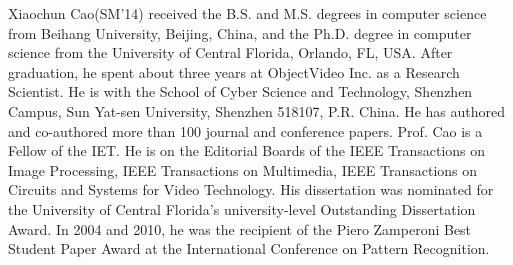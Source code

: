 \begin{IEEEbiography}
{Xiaochun Cao}(SM'14)
received the B.S. and M.S. degrees in computer science from Beihang University, Beijing, China, and the Ph.D. degree in computer science from the University of Central Florida, Orlando, FL, USA. After graduation, he spent about three years at ObjectVideo Inc. as a Research Scientist. He is with the School of Cyber Science and Technology, Shenzhen Campus, Sun Yat-sen University, Shenzhen 518107, P.R. China. He has authored and co-authored more than 100 journal and conference papers.
Prof. Cao is a Fellow of the IET. He is on the Editorial Boards of the IEEE Transactions on Image Processing, IEEE Transactions on Multimedia, IEEE Transactions on Circuits and Systems for Video Technology. His dissertation was nominated for the University of Central Florida's university-level Outstanding Dissertation Award. In 2004 and 2010, he was the recipient of the Piero Zamperoni Best Student Paper Award at the International Conference on Pattern Recognition.
\end{IEEEbiography}